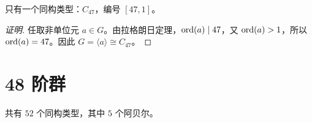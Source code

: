 \documentclass[UTF8,fontset=fandol,11pt,a4paper]{ctexart}
\begin{document}
只有一个同构类型：$C_{47}$，编号 $[47,1]$。

\begin{proof}[证明]
任取非单位元 $a\in G$。由拉格朗日定理，$\operatorname{ord}(a)\mid 47$，又 $\operatorname{ord}(a)>1$，所以 $\operatorname{ord}(a)=47$。因此 $G=\langle a\rangle\cong C_{47}$。
\end{proof}

\section*{48 阶群}\label{order:48}

共有 $52$ 个同构类型，其中 $5$ 个阿贝尔。

\begingroup\small\setlength{\tabcolsep}{3pt}\renewcommand{\arraystretch}{1.12}
\end{document}
